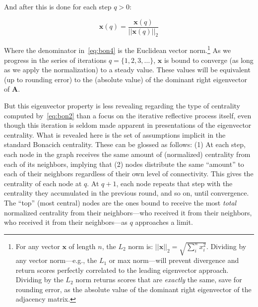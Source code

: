 \documentclass[a4paper,fleqn]{cas-sc}
\begin{document}
And after this is done for each step $q > 0$:

\begin{equation}
    \mathbf{x}(q) = \frac{\mathbf{x}(q)}{||\mathbf{x}(q)||_2}
    \label{eq:bon4}
\end{equation}

Where the denominator in~\ref{eq:bon4} is the Euclidean vector norm.\footnote{For any vector $\mathbf{x}$ of length $n$, the $L_2$ norm is: $||\mathbf{x}||_2 = \sqrt{\sum_i^n x_i^2}$. Dividing by any vector norm---e.g., the $L_1$ or max norm---will prevent divergence and return scores perfectly correlated to the leading eigenvector approach. Dividing by the $L_2$ norm returns scores that are \textit{exactly} the same, save for rounding error, as the absolute value of the dominant right eigenvector of the adjacency matrix.} As we progress in the series of iterations $q = \{1, 2, 3, \ldots\}$, $\mathbf{x}$ is bound to converge (as long as we apply the normalization) to a steady value. These values will be equivalent (up to rounding error) to the (absolute value) of the dominant right eigenvector of $\mathbf{A}$.

But this eigenvector property is less revealing regarding the type of centrality computed by~\ref{eq:bon2} than a focus on the iterative reflective process itself, even though this iteration is seldom made apparent in presentations of the eigenvector centrality. What is revealed here is the set of assumptions implicit in the standard Bonacich centrality. These can be glossed as follows: (1) At each step, each node in the graph receives the same amount of (normalized) centrality from each of its neighbors, implying that (2) nodes distribute the same ``amount'' to each of their neighbors regardless of their own level of connectivity. This gives the centrality of each node at $q$. At $q + 1$, each node repeats that step with the centrality they accumulated in the previous round, and so on, until convergence.  The ``top'' (most central) nodes are the ones bound to receive the most \textit{total} normalized centrality from their neighbors---who received it from their neighbors, who received it from their neighbors---as $q$ approaches a limit. 


\end{document}

